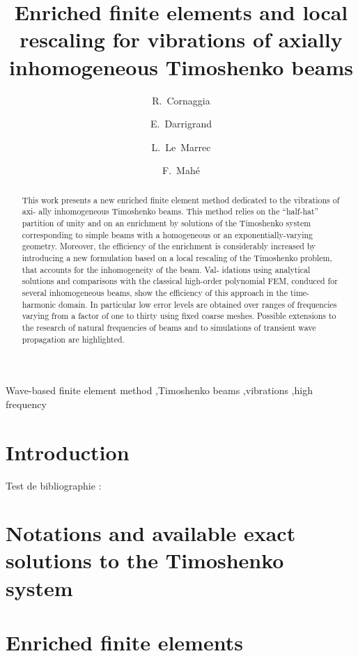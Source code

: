 \documentclass[3p]{elsarticle}
\title{Enriched finite elements and local rescaling for vibrations of axially inhomogeneous {Timoshenko} beams}
\author[irmar]{R.~Cornaggia\corref{cor1}}
\author[irmar]{E.~Darrigrand}
\author[irmar]{L.~Le~Marrec }
\author[irmar]{F.~Mah\'e}
\begin{document}
\begin{abstract}
This work presents a new enriched finite element method dedicated to the vibrations of axi- ally inhomogeneous Timoshenko beams. This method relies on the “half-hat” partition of unity and on an enrichment by solutions of the Timoshenko system corresponding to simple beams with a homogeneous or an exponentially-varying geometry. Moreover, the efficiency of the enrichment is considerably increased by introducing a new formulation based on a local rescaling of the Timoshenko problem, that accounts for the inhomogeneity of the beam. Val- idations using analytical solutions and comparisons with the classical high-order polynomial FEM, conduced for several inhomogeneous beams, show the efficiency of this approach in the time-harmonic domain. In particular low error levels are obtained over ranges of frequencies varying from a factor of one to thirty using fixed coarse meshes. Possible extensions to the research of natural frequencies of beams and to simulations of transient wave propagation are highlighted.
\end{abstract}

\begin{keyword}
  Wave-based finite element method \sep Timoshenko beams \sep vibrations \sep high frequency
\end{keyword}

\maketitle


%
\section{Introduction}


Test de bibliographie :
 

%
\section{Notations and available exact solutions to the Timoshenko system}


\section{Enriched finite elements}
 
\end{document}

